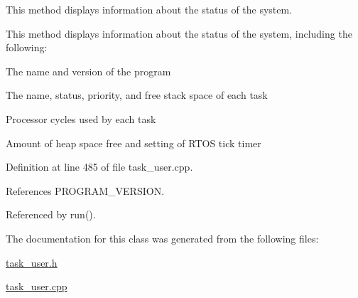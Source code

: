 This method displays information about the status of the system. 

This method displays information about the status of the system, including the following\-: \begin{DoxyItemize}
\item The name and version of the program \item The name, status, priority, and free stack space of each task \item Processor cycles used by each task \item Amount of heap space free and setting of R\-T\-O\-S tick timer \end{DoxyItemize}


Definition at line 485 of file task\-\_\-user.\-cpp.



References P\-R\-O\-G\-R\-A\-M\-\_\-\-V\-E\-R\-S\-I\-O\-N.



Referenced by run().



The documentation for this class was generated from the following files\-:\begin{DoxyCompactItemize}
\item 
\hyperlink{task__user_8h}{task\-\_\-user.\-h}\item 
\hyperlink{task__user_8cpp}{task\-\_\-user.\-cpp}\end{DoxyCompactItemize}
